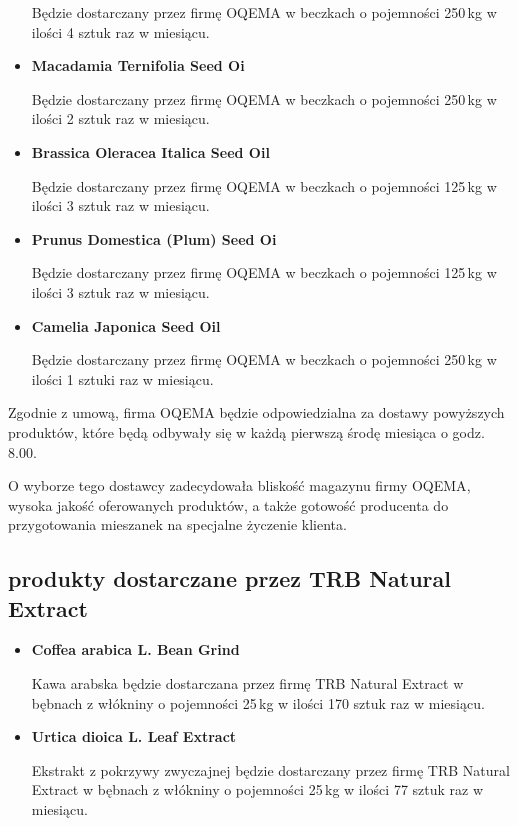 \begin{itemize}
	Będzie dostarczany przez firmę \textsf{OQEMA} w beczkach o pojemności 250\,kg w ilości 4 sztuk raz w miesiącu.
	\item \textbf{Macadamia Ternifolia Seed Oi}

	Będzie dostarczany przez firmę \textsf{OQEMA} w beczkach o pojemności 250\,kg w ilości 2 sztuk raz w miesiącu.
	\item \textbf{Brassica Oleracea Italica Seed Oil}

	Będzie dostarczany przez firmę \textsf{OQEMA} w beczkach o pojemności 125\,kg w ilości 3 sztuk raz w miesiącu.
	\item \textbf{Prunus Domestica (Plum) Seed Oi}

	Będzie dostarczany przez firmę \textsf{OQEMA} w beczkach o pojemności 125\,kg w ilości 3 sztuk raz w miesiącu.
	\item \textbf{Camelia Japonica Seed Oil}

	Będzie dostarczany przez firmę \textsf{OQEMA} w beczkach o pojemności 250\,kg w ilości 1 sztuki raz w miesiącu.

\end{itemize}\vspace{\baselineskip}
	Zgodnie z umową, firma \textsf{OQEMA} będzie odpowiedzialna za dostawy powyższych produktów, które będą odbywały się w każdą pierwszą środę miesiąca o godz. 8.00.

	O wyborze tego dostawcy zadecydowała bliskość magazynu firmy \textsf{OQEMA}, wysoka jakość oferowanych produktów, a także gotowość producenta do przygotowania mieszanek na specjalne życzenie klienta.

\subsection{produkty dostarczane przez \textsf{TRB Natural Extract}}

\begin{itemize}
	\item \textbf{Coffea arabica L. Bean Grind}

	Kawa arabska będzie dostarczana przez firmę \textsf{TRB Natural Extract} w bębnach z włókniny o pojemności 25\,kg w ilości 170 sztuk raz w miesiącu.
	\item \textbf{Urtica dioica L. Leaf Extract}

	Ekstrakt z pokrzywy zwyczajnej będzie dostarczany przez firmę \textsf{TRB Natural Extract} w bębnach z włókniny o pojemności 25\,kg w ilości 77 sztuk raz w miesiącu. 
\end{itemize}\vspace{\baselineskip}


